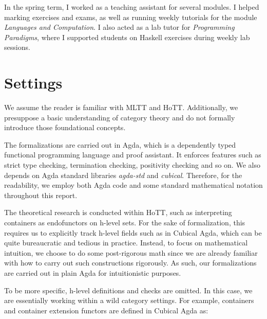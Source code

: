 In the spring term, I worked as a teaching assistant for several modules. I helped marking exercises and exams, as well as running weekly tutorials for the module \textit{Languages and Computation}. I also acted as a lab tutor for \textit{Programming Paradigms}, where I supported students on Haskell exercises during weekly lab sessions.

\section{Settings}

We assume the reader is familiar with MLTT and HoTT. Additionally, we presuppose a basic understanding of category theory and do not formally introduce those foundational concepts. 

The formalizations are carried out in Agda\cite{norell2007towards}, which is a dependently typed functional programming language and proof assistant. It enforces features such as strict type checking, termination checking, positivity checking and so on. We also depends on Agda standard libraries \textit{agda-std} and \textit{cubical}. Therefore, for the readability, we employ both Agda code and some standard mathematical notation throughout this report.

The theoretical research is conducted within HoTT, such as interpreting containers as endofunctors on h-level sets. For the sake of formalization, this requires us to explicitly track h-level fields such as  in Cubical Agda, which can be quite bureaucratic and tedious in practice. Instead, to focus on mathematical intuition, we choose to do some post-rigorous math since we are already familiar with how to carry out such constructions rigorously. As such, our formalizations are carried out in plain Agda for intuitionistic purposes.

To be more specific, h-level definitions and checks are omitted. In this case, we are essentially working within a wild category settings. For example, containers and container extension functors are defined in Cubical Agda as:

